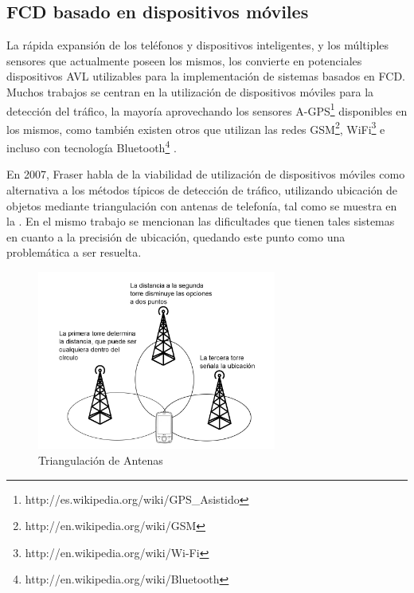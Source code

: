
\subsection{FCD basado en dispositivos móviles}

La rápida expansión de los teléfonos y dispositivos inteligentes, y los múltiples sensores que actualmente poseen los mismos, los convierte en potenciales dispositivos AVL utilizables para la implementación de sistemas basados en FCD. Muchos trabajos se centran en la utilización de dispositivos móviles para la detección del tráfico, la mayoría aprovechando los sensores A-GPS\footnote{http://es.wikipedia.org/wiki/GPS\_Asistido} disponibles en los mismos, como también existen otros que utilizan las redes GSM\footnote{http://en.wikipedia.org/wiki/GSM}, WiFi\footnote{http://en.wikipedia.org/wiki/Wi-Fi} e incluso con tecnología Bluetooth\footnote{http://en.wikipedia.org/wiki/Bluetooth} \citep{thiagarajan2010cooperative,thiagarajan2009vtrack,fraser2007use,fang2011enacq,ruppe2012augmenting}.

En 2007, Fraser \citep{fraser2007use} habla de la viabilidad de utilización de dispositivos móviles como alternativa a los métodos típicos de detección de tráfico, utilizando ubicación de objetos mediante triangulación con antenas de telefonía, tal como se muestra en la . En el mismo trabajo se mencionan las dificultades que tienen tales sistemas en cuanto a la precisión de ubicación, quedando este punto como una problemática a ser resuelta.

\begin{figure}[h]
	\centering
	\includegraphics[width=0.7\textwidth]{capitulos/3/figuras/figura5.jpg}
	\caption{\label{fig:triangulacionAntenas} Triangulación de Antenas}	
\end{figure}

